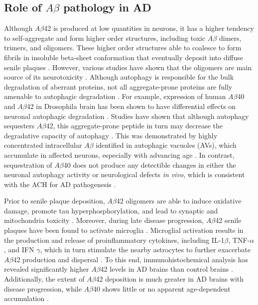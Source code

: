 \subsection{Role of $A\beta$ pathology in AD}
Although $A\beta$42 is produced at low quantities in neurons, it has a higher tendency to self-aggregate and form higher order structures, including toxic $A\beta$ dimers, trimers, and oligomers. These higher order structures able to coalesce to form fibrils in insoluble beta-sheet conformation that eventually deposit into diffuse senile plaques \citep{Burdick1992,Gravina1995}. However, various studies have shown that the oligomers are main source of its neurotoxicity \citep{Shankar2008,Shankar2009}. Although autophagy is responsible for the bulk degradation of aberrant proteins, not all aggregate-prone proteins are fully amenable to autophagic degradation \citep{Wong2008}. For example, expression of human $A\beta$40 and $A\beta$42 in Drosophila brain has been shown to have differential effects on neuronal autophagic degradation \citep{Ling2009}. Studies have shown that although autophagy sequesters $A\beta$42, this aggregate-prone peptide in turn may decrease the degradative capacity of autophagy \citep{Ling2014,Ling2011}. This was demonstrated by highly concentrated intracellular $A\beta$ identified in autophagic vacuoles (AVs), which accumulate in affected neurons, especially with advancing age \citep{Ling2011}. In contrast, sequestration of $A\beta$40 does not produce any detectible changes in either the neuronal autophagy activity or neurological defects \textit{in vivo}, which is consistent with the ACH for AD pathogenesis \citep{Hardy1992}.

Prior to senile plaque deposition, $A\beta$42 oligomers are able to induce oxidative damage, promote tau hyperphosphorylation, and lead to synaptic and mitochondria toxicity \citep{Kaminsky2015,Lustbader2004}. Moreover, during late disease progression, $A\beta$42 senile plaques have been found to activate microglia \citep{Rosenmann2013}. Microglial activation results in the production and release of proinflammatory cytokines, including IL-1$\beta$, TNF-$\alpha$, and IFN $\gamma$, which in turn stimulate the nearby astrocytes to further exacerbate $A\beta$42 production and dispersal \citep{DalPra2015}. To this end, immunohistochemical analysis has revealed significantly higher $A\beta$42 levels in AD brains than control brains \citep{Funato1998}. Additionally, the extent of $A\beta$42 deposition is much greater in AD brains with disease progression, while $A\beta$40 shows little or no apparent age-dependent accumulation \citep{Funato1998}.

